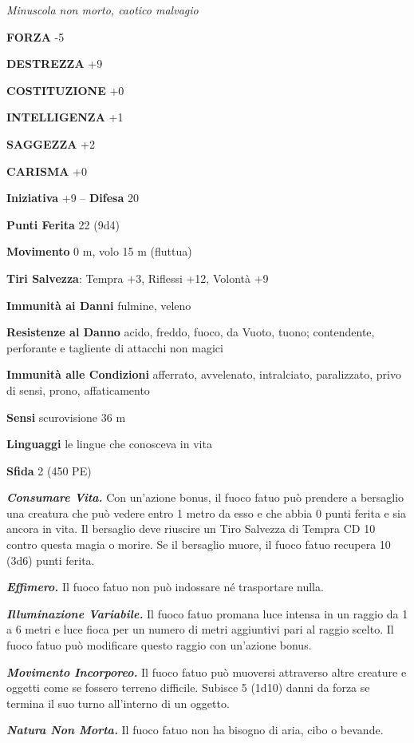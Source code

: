 \begin{multicols}{2}
\emph{Minuscola non morto, caotico malvagio}

\textbf{FORZA} -5

\textbf{DESTREZZA} +9

\textbf{COSTITUZIONE} +0

\textbf{INTELLIGENZA} +1

\textbf{SAGGEZZA} +2

\textbf{CARISMA} +0

\textbf{Iniziativa} +9 -- \textbf{Difesa} 20

\textbf{Punti Ferita} 22 (9d4)

\textbf{Movimento} 0 m, volo 15 m (fluttua)

\textbf{Tiri Salvezza}: Tempra +3, Riflessi +12, Volontà +9

\textbf{Immunità ai Danni} fulmine, veleno

\textbf{Resistenze al Danno} acido, freddo, fuoco, da Vuoto, tuono; contendente, perforante e tagliente di attacchi non magici

\textbf{Immunità alle Condizioni} afferrato, avvelenato, intralciato, paralizzato, privo di sensi, prono, affaticamento

\textbf{Sensi} scurovisione 36 m

\textbf{Linguaggi} le lingue che conosceva in vita

\textbf{Sfida} 2 (450 PE)

\emph{\textbf{Consumare Vita.}} Con un'azione bonus, il fuoco fatuo può prendere a bersaglio una creatura che può vedere entro 1 metro da esso e che abbia 0 punti ferita e sia ancora in vita. Il bersaglio deve riuscire un Tiro Salvezza di Tempra CD 10 contro questa magia o morire. Se il bersaglio muore, il fuoco fatuo recupera 10 (3d6) punti ferita.

\emph{\textbf{Effimero.}} Il fuoco fatuo non può indossare né trasportare nulla.

\emph{\textbf{Illuminazione Variabile.}} Il fuoco fatuo promana luce intensa in un raggio da 1 a 6 metri e luce fioca per un numero di metri aggiuntivi pari al raggio scelto. Il fuoco fatuo può modificare questo raggio con un'azione bonus.

\emph{\textbf{Movimento Incorporeo.}} Il fuoco fatuo può muoversi attraverso altre creature e oggetti come se fossero terreno difficile. Subisce 5 (1d10) danni da forza se termina il suo turno all'interno di un oggetto.

\emph{\textbf{Natura Non Morta.}} Il fuoco fatuo non ha bisogno di aria, cibo o bevande.


\end{multicols}
